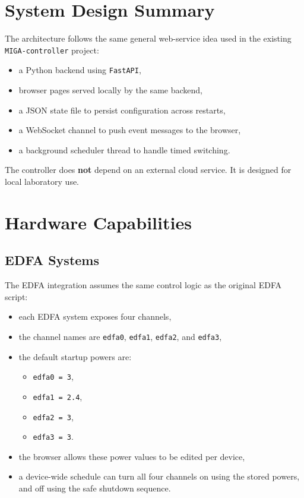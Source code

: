 \documentclass[11pt,a4paper]{article}
\begin{document}
\section{System Design Summary}
The architecture follows the same general web-service idea used in the existing \texttt{MIGA-controller} project:
\begin{itemize}[leftmargin=1.5em]
    \item a Python backend using \texttt{FastAPI},
    \item browser pages served locally by the same backend,
    \item a JSON state file to persist configuration across restarts,
    \item a WebSocket channel to push event messages to the browser,
    \item a background scheduler thread to handle timed switching.
\end{itemize}

The controller does \textbf{not} depend on an external cloud service. It is designed for local laboratory use.

\section{Hardware Capabilities}
\subsection{EDFA Systems}
The EDFA integration assumes the same control logic as the original EDFA script:
\begin{itemize}[leftmargin=1.5em]
    \item each EDFA system exposes four channels,
    \item the channel names are \texttt{edfa0}, \texttt{edfa1}, \texttt{edfa2}, and \texttt{edfa3},
    \item the default startup powers are:
    \begin{itemize}[leftmargin=1.5em]
        \item \texttt{edfa0 = 3},
        \item \texttt{edfa1 = 2.4},
        \item \texttt{edfa2 = 3},
        \item \texttt{edfa3 = 3}.
    \end{itemize}
    \item the browser allows these power values to be edited per device,
    \item a device-wide schedule can turn all four channels on using the stored powers, and off using the safe shutdown sequence.
\end{itemize}
\end{document}
